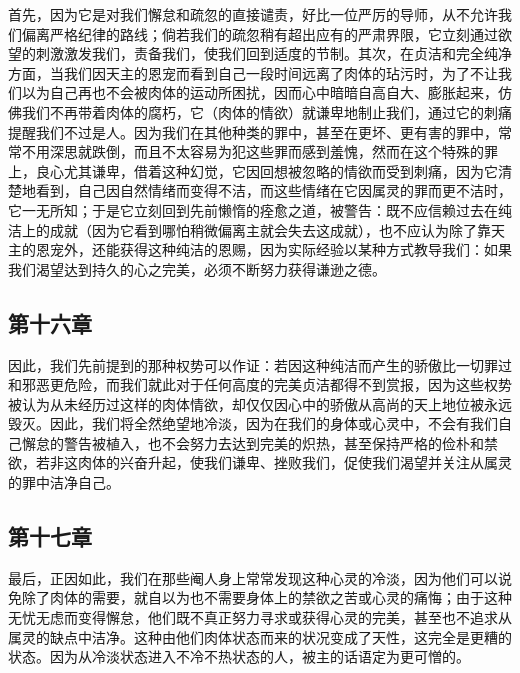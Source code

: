 首先，因为它是对我们懈怠和疏忽的直接谴责，好比一位严厉的导师，从不允许我们偏离严格纪律的路线；倘若我们的疏忽稍有超出应有的严肃界限，它立刻通过欲望的刺激激发我们，责备我们，使我们回到适度的节制。其次，在贞洁和完全纯净方面，当我们因天主的恩宠而看到自己一段时间远离了肉体的玷污时，为了不让我们以为自己再也不会被肉体的运动所困扰，因而心中暗暗自高自大、膨胀起来，仿佛我们不再带着肉体的腐朽，它（肉体的情欲）就谦卑地制止我们，通过它的刺痛提醒我们不过是人。因为我们在其他种类的罪中，甚至在更坏、更有害的罪中，常常不用深思就跌倒，而且不太容易为犯这些罪而感到羞愧，然而在这个特殊的罪上，良心尤其谦卑，借着这种幻觉，它因回想被忽略的情欲而受到刺痛，因为它清楚地看到，自己因自然情绪而变得不洁，而这些情绪在它因属灵的罪而更不洁时，它一无所知；于是它立刻回到先前懒惰的痊愈之道，被警告：既不应信赖过去在纯洁上的成就（因为它看到哪怕稍微偏离主就会失去这成就），也不应认为除了靠天主的恩宠外，还能获得这种纯洁的恩赐，因为实际经验以某种方式教导我们：如果我们渴望达到持久的心之完美，必须不断努力获得谦逊之德。\par


\subsection{第十六章}

\par

因此，我们先前提到的那种权势可以作证：若因这种纯洁而产生的骄傲比一切罪过和邪恶更危险，而我们就此对于任何高度的完美贞洁都得不到赏报，因为这些权势被认为从未经历过这样的肉体情欲，却仅仅因心中的骄傲从高尚的天上地位被永远毁灭。因此，我们将全然绝望地冷淡，因为在我们的身体或心灵中，不会有我们自己懈怠的警告被植入，也不会努力去达到完美的炽热，甚至保持严格的俭朴和禁欲，若非这肉体的兴奋升起，使我们谦卑、挫败我们，促使我们渴望并关注从属灵的罪中洁净自己。\par


\subsection{第十七章}

\par

最后，正因如此，我们在那些阉人身上常常发现这种心灵的冷淡，因为他们可以说免除了肉体的需要，就自以为也不需要身体上的禁欲之苦或心灵的痛悔；由于这种无忧无虑而变得懈怠，他们既不真正努力寻求或获得心灵的完美，甚至也不追求从属灵的缺点中洁净。这种由他们肉体状态而来的状况变成了天性，这完全是更糟的状态。因为从冷淡状态进入不冷不热状态的人，被主的话语定为更可憎的。\par


